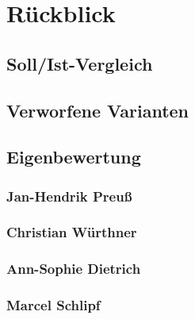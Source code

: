 \chapter{Rückblick}

\section{Soll/Ist-Vergleich}

\section{Verworfene Varianten}

\section{Eigenbewertung}

\subsection*{Jan-Hendrik Preuß}

\subsection*{Christian Würthner}

\subsection*{Ann-Sophie Dietrich}

\subsection*{Marcel Schlipf}